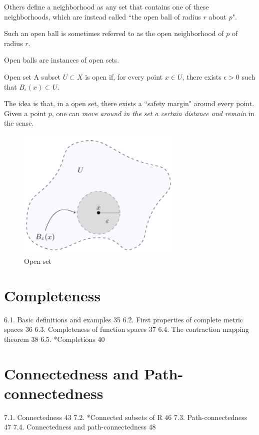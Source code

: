 \begin{remark}
Others define a neighborhood as any set that contains one of these neighborhoods, which are instead called ``the open ball of radius $r$ about $p$".
\end{remark}

Such an open ball is sometimes referred to as the open neighborhood of $p$ of radius $r$.

Open balls are instances of open sets.

\begin{defn}{Open set}{}
A subset $U \subset X$ is open if, for every point $x \in U$, there exists $\epsilon > 0$ such that $B_{\epsilon}(x) \subset U$.
\end{defn}

The idea is that, in a open set, there exists a ``safety margin" around every point. Given a point $p$, one can \emph{move around in the set a certain distance and remain} in the sense.

\begin{figure}[H]
    \centering
    \includegraphics[width=8cm]{images/open_set.png}
    \caption{Open set}
\end{figure}




\section{Completeness}
6.1. Basic definitions and examples 35
6.2. First properties of complete metric spaces 36
6.3. Completeness of function spaces 37
6.4. The contraction mapping theorem 38
6.5. *Completions 40

\section{Connectedness and Path-connectedness}
7.1. Connectedness 43
7.2. *Connected subsets of R 46
7.3. Path-connectedness 47
7.4. Connectedness and path-connectedness 48

